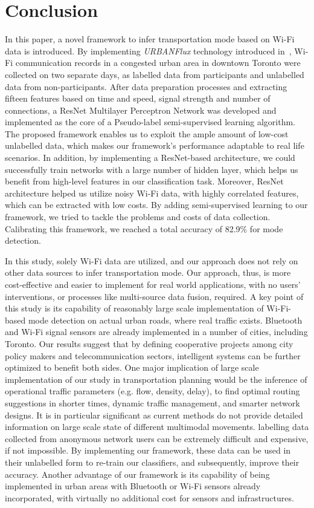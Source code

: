 \section{Conclusion}
\label{S:w6}
In this paper, a novel framework to infer transportation mode based on Wi-Fi data is introduced. By implementing \emph{URBANFlux} technology introduced in~\cite{farooq2015ubiquitous}, Wi-Fi communication records in a congested urban area in downtown Toronto were collected on two separate days, as labelled data from participants and unlabelled data from non-participants. After data preparation processes and extracting fifteen features based on time and speed, signal strength and number of connections, a ResNet Multilayer Perceptron Network was developed and implemented as the core of a Pseudo-label semi-supervised learning algorithm. The proposed framework enables us to exploit the ample amount of low-cost unlabelled data, which makes our framework's performance adaptable to real life scenarios. In addition, by implementing a ResNet-based architecture, we could successfully train networks with a large number of hidden layer, which helps us benefit from high-level features in our classification task. Moreover, ResNet architecture helped us utilize noisy Wi-Fi data, with highly correlated features, which can be extracted with low costs. By adding semi-supervised learning to our framework, we tried to tackle the problems and costs of data collection. Calibrating this framework, we reached a total accuracy of 82.9\% for mode detection. 

In this study, solely Wi-Fi data are utilized, and our approach does not rely on other data sources to infer transportation mode. Our approach, thus, is more cost-effective and easier to implement for real world applications, with no users' interventions, or processes like multi-source data fusion, required. A key point of this study is its capability of reasonably large scale implementation of Wi-Fi-based mode detection on actual urban roads, where real traffic exists. Bluetooth and Wi-Fi signal sensors are already implemented in a number of cities, including Toronto. Our results suggest that by defining cooperative projects among city policy makers and telecommunication sectors, intelligent systems can be further optimized to benefit both sides. One major implication of large scale implementation of our study in transportation planning would be the inference of operational traffic parameters (e.g. flow, density, delay), to find optimal routing suggestions in shorter times, dynamic traffic management, and smarter network designs. It is in particular significant as current methods do not provide detailed information on large scale state of different multimodal movements. labelling data collected from anonymous network users can be extremely difficult and expensive, if not impossible. By implementing our framework, these data can be used in their unlabelled form to re-train our classifiers, and subsequently, improve their accuracy. Another advantage of our framework is its capability of being implemented in urban areas with Bluetooth or Wi-Fi sensors already incorporated, with virtually no additional cost for sensors and infrastructures.

